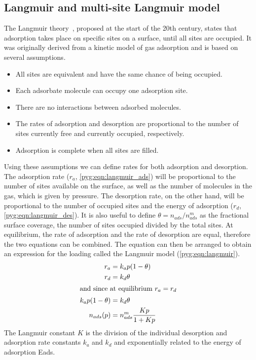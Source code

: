 \subsection{Langmuir and multi-site Langmuir
	model}\label{pyg:models:langmuir}

The Langmuir theory~\cite{langmuirAdsorptionGasesPlane1918},
proposed at the start of the 20th century, states that
adsorption takes place on specific sites on a surface, until
all sites are occupied.
It was originally derived from a kinetic model of gas adsorption and
is based on several assumptions.

\begin{itemize}

	\item All sites are equivalent and have the same chance of
	      being occupied.
	\item Each adsorbate molecule can occupy one adsorption site.
	\item There are no interactions between adsorbed molecules.
	\item The rates of adsorption and desorption are proportional
	      to the number of sites currently free and currently occupied,
	      respectively.
	\item Adsorption is complete when all sites are filled.

\end{itemize}

Using these assumptions we can define rates for both adsorption and
desorption. The adsorption rate (\(r_a\), \autoref{pyg:eqn:langmuir_ads})
will be proportional to the number of sites available on the surface,
as well as the number of molecules in the gas, which is given by
pressure.
The desorption rate, on the other hand, will be proportional to the
number of occupied sites and the energy of adsorption
(\(r_d\), \autoref{pyg:eqn:langmuir_des}).
It is also useful to define \(\theta = n_{ads}/n_{ads}^m\) as the fractional
surface coverage, the number of sites occupied divided by the total 
sites. At equilibrium, the rate of adsorption and the rate of
desorption are equal, therefore the two equations can be combined.
The equation can then be arranged to obtain an expression for the
loading called the Langmuir model (\autoref{pyg:eqn:langmuir}).
%
\begin{align}
	r_a                & = k_a p (1 - \theta) \label{pyg:eqn:langmuir_ads} \\
	r_d                & = k_d \theta \label{pyg:eqn:langmuir_des} \\
	\intertext{and since at equilibrium \(r_a = r_d\)}
	k_a p (1 - \theta) & = k_d \theta \\
	n_{ads}(p)             & = n_{ads}^m \frac{Kp}{1+Kp} \label{pyg:eqn:langmuir}
\end{align}
%
The Langmuir constant \(K\) is the division of the individual
desorption and adsorption rate constants \(k_a\) and \(k_d\) and exponentially
related to the energy of adsorption \gls{Eads}.


